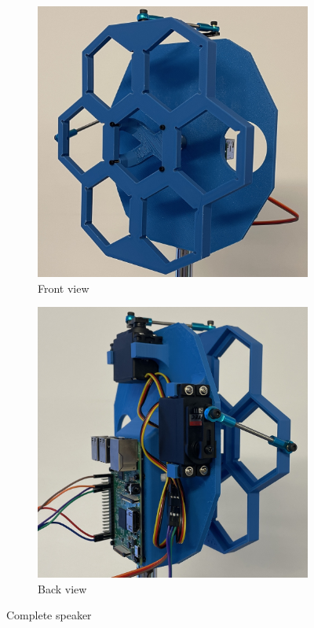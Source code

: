 \begin{figure}[ht]
  \begin{subfigure}[b]{0.49\textwidth}
    \includegraphics[width=\textwidth]{src/assets/pictures/construction/construction_front.JPG}
    \caption{Front view}
    \label{fig:const:int:const_front}
  \end{subfigure}
  \hfill
  \begin{subfigure}[b]{0.49\textwidth}
    \includegraphics[width=\textwidth]{src/assets/pictures/construction/construction_back.JPG}
    \caption{Back view}
    \label{fig:const:int:const_back}
  \end{subfigure}
  \caption{Complete speaker}
  \label{fig:const:int:const}
\end{figure}
%
